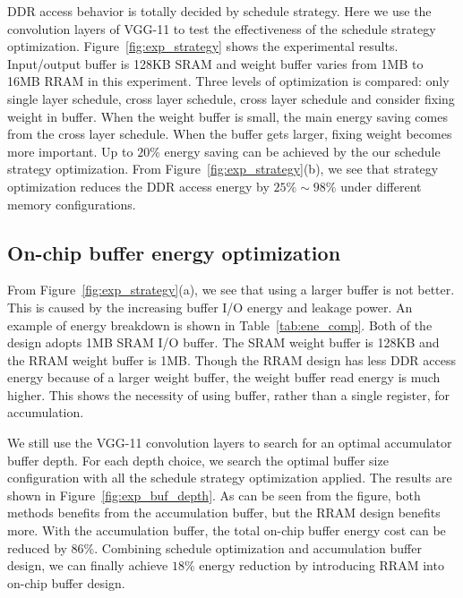 \documentclass[10pt, conference]{IEEEtran}
\begin{document}
    DDR access behavior is totally decided by schedule strategy. Here we use the convolution layers of VGG-11 to test the effectiveness of the schedule strategy optimization. Figure~\ref{fig:exp_strategy} shows the experimental results. Input/output buffer is 128KB SRAM and weight buffer varies from 1MB to 16MB RRAM in this experiment. Three levels of optimization is compared: only single layer schedule, cross layer schedule, cross layer schedule and consider fixing weight in buffer. When the weight buffer is small, the main energy saving comes from the cross layer schedule. When the buffer gets larger, fixing weight becomes more important. Up to $20\%$ energy saving can be achieved by the our schedule strategy optimization. From Figure~\ref{fig:exp_strategy}(b), we see that strategy optimization reduces the DDR access energy by $25\%\sim 98\%$ under different memory configurations.
    
    \subsection{On-chip buffer energy optimization}
    From Figure~\ref{fig:exp_strategy}(a), we see that using a larger buffer is not better. This is caused by the increasing buffer I/O energy and leakage power. An example of energy breakdown is shown in Table~\ref{tab:ene_comp}. Both of the design adopts 1MB SRAM I/O buffer. The SRAM weight buffer is 128KB and the RRAM weight buffer is 1MB. Though the RRAM design has less DDR access energy because of a larger weight buffer, the weight buffer read energy is much higher. This shows the necessity of using buffer, rather than a single register, for accumulation. 
    
    
    
    We still use the VGG-11 convolution layers to search for an optimal accumulator buffer depth. For each depth choice, we search the optimal buffer size configuration with all the schedule strategy optimization applied. The results are shown in Figure~\ref{fig:exp_buf_depth}. As can be seen from the figure, both methods benefits from the accumulation buffer, but the RRAM design benefits more. With the accumulation buffer, the total on-chip buffer energy cost can be reduced by $86\%$. Combining schedule optimization and accumulation buffer design, we can finally achieve $18\%$ energy reduction by introducing RRAM into on-chip buffer design.
    
\end{document}

